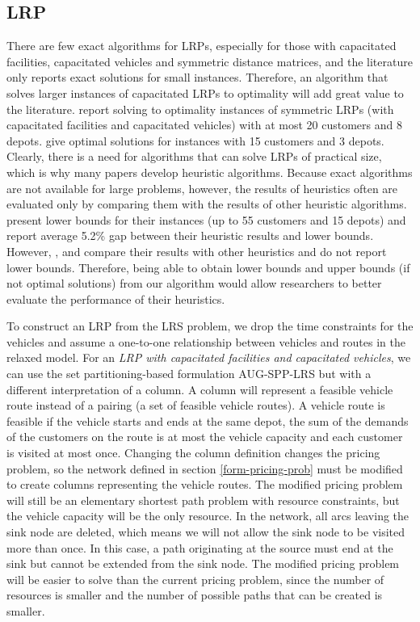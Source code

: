 \subsection{LRP}

There are few exact algorithms for LRPs, especially for those with 
capacitated facilities, capacitated vehicles and symmetric distance matrices, 
and the literature only reports exact solutions for small instances. Therefore, 
an algorithm that solves larger instances of capacitated LRPs to optimality 
will add great value to the literature. \citet{Laporte86} report solving 
to optimality instances of symmetric LRPs (with capacitated facilities
and capacitated vehicles) with at most 20 customers and 8 depots. \citet{Hansen} 
give optimal solutions for instances with 15 customers and 3 depots. 
Clearly, there is a need for algorithms that can solve LRPs of practical 
size, which is why many papers develop heuristic algorithms. Because exact algorithms
are not available for large problems, however, the results of heuristics 
often are evaluated only by comparing them with the results of other heuristic algorithms. 
\citet{Perl} present lower bounds for their instances (up to 55 customers 
and 15 depots) and report average 5.2\% gap between their heuristic results 
and lower bounds. However, \citet{Srivastava}, \citet{Srivastava2} and 
\citet{Tuzun} compare their results with other heuristics and do not report 
lower bounds. Therefore, being able to obtain lower bounds and 
upper bounds (if  not optimal solutions) from our algorithm would allow researchers to 
better evaluate 
the performance of their heuristics. 

To construct an LRP from the LRS problem, we drop the time constraints for 
the vehicles and assume a one-to-one relationship between vehicles and routes 
in the relaxed model. For an {\em LRP with capacitated facilities and capacitated 
vehicles}, we can use the set partitioning-based formulation AUG-SPP-LRS 
but with a different interpretation of a column. A column will represent a
feasible vehicle route instead of a pairing (a set of feasible vehicle routes). 
A vehicle route is feasible if the vehicle starts and ends at the same depot, 
the sum of the demands of the customers on the route is at most the vehicle 
capacity and each customer is visited at most once. Changing the column
definition changes the pricing problem, so the network defined in section 
\ref{form-pricing-prob} must be modified to create columns representing 
the vehicle routes. The modified pricing problem will still be an elementary 
shortest path problem with resource constraints,  but the vehicle capacity 
will be the only resource. In the network, all arcs leaving the sink node 
are deleted, which means we will not allow the sink node to be visited more 
than once. In  this case, a path originating at the source must end at the 
sink but cannot be extended from the sink node. The modified pricing problem 
will be easier to solve than the current pricing problem, since the number of 
resources is smaller and the number of possible paths that can be created 
is smaller. 

